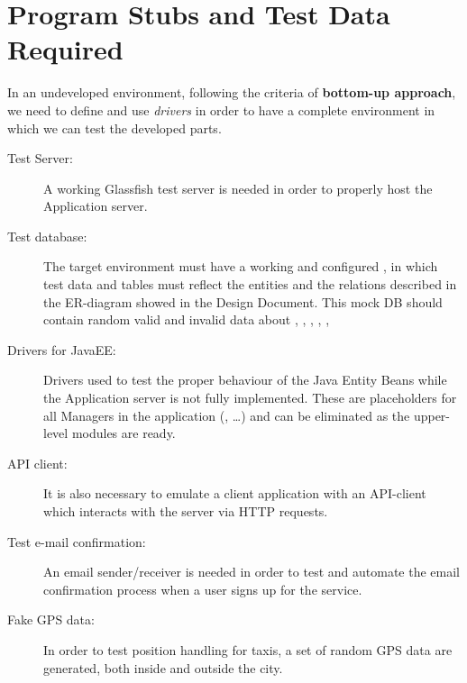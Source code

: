 \documentclass[a4paper, 12pt]{article}
\begin{document}
\newpage
\section{Program Stubs and Test Data Required}
\label{sub:program_stubs_and_test_data_required}
In an undeveloped environment, following the criteria of \textbf{bottom-up approach}, we need to define and use \emph{drivers} in order to have a complete environment in which we can test the developed parts.

\begin{description}
    \item[Test Server:] A working Glassfish test server is needed in order to properly host the Application server. 

    \item[Test database:] The target environment must have a working and configured , in which test data and tables must reflect the entities and the relations described in the ER-diagram showed in the Design Document. This mock DB should contain random valid and invalid data about , , , , , 

    \item[Drivers for JavaEE:] Drivers used to test the proper behaviour of the Java Entity Beans while the Application server is not fully implemented. These are placeholders for all Managers in the application (, \ldots) and can be eliminated as the upper-level modules are ready. 

    \item[API client:] It is also necessary to emulate a client application  with an API-client which interacts with the server via HTTP requests.

    \item[Test e-mail confirmation:] An email sender/receiver is needed in order to test and automate the email confirmation process when a user signs up for the service.

    \item[Fake GPS data:] In order to test position handling for taxis, a set of random GPS data are generated, both inside and outside the city.
\end{description}

\appendix

\clearpage
{}
\end{document}
